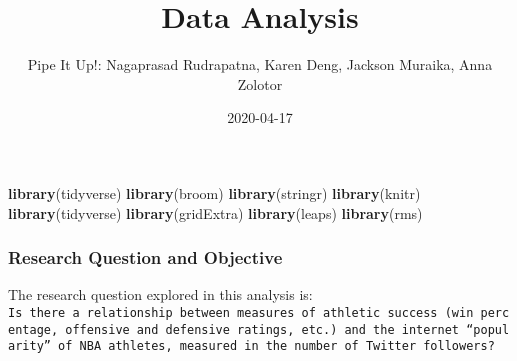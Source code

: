 \documentclass[]{article}
\title{Data Analysis}
\author{Pipe It Up!: Nagaprasad Rudrapatna, Karen Deng, Jackson Muraika, Anna
Zolotor}
\date{2020-04-17}
\newenvironment{Shaded}{\begin{snugshade}}{\end{snugshade}}
\newcommand{\DecValTok}[1]{\textcolor[rgb]{0.00,0.00,0.81}{#1}}
\newcommand{\KeywordTok}[1]{\textcolor[rgb]{0.13,0.29,0.53}{\textbf{#1}}}
\newcommand{\NormalTok}[1]{#1}
\newcommand{\OperatorTok}[1]{\textcolor[rgb]{0.81,0.36,0.00}{\textbf{#1}}}
\newcommand{\StringTok}[1]{\textcolor[rgb]{0.31,0.60,0.02}{#1}}
\begin{document}
\maketitle

\begin{Shaded}
\begin{Highlighting}[]
\KeywordTok{library}\NormalTok{(tidyverse)}
\KeywordTok{library}\NormalTok{(broom)}
\KeywordTok{library}\NormalTok{(stringr)}
\KeywordTok{library}\NormalTok{(knitr)}
\KeywordTok{library}\NormalTok{(tidyverse)}
\KeywordTok{library}\NormalTok{(gridExtra)}
\KeywordTok{library}\NormalTok{(leaps)}
\KeywordTok{library}\NormalTok{(rms)}
\end{Highlighting}
\end{Shaded}

\begin{Shaded}
\end{Shaded}

\hypertarget{research-question-and-objective}{%
\subsubsection{Research Question and
Objective}\label{research-question-and-objective}}

The research question explored in this analysis is:
\texttt{Is\ there\ a\ relationship\ between\ measures\ of\ athletic\ success\ (win\ percentage,\ offensive\ and\ defensive\ ratings,\ etc.)\ and\ the\ internet\ “popularity”\ of\ NBA\ athletes,\ measured\ in\ the\ number\ of\ Twitter\ followers?}
\end{document}
